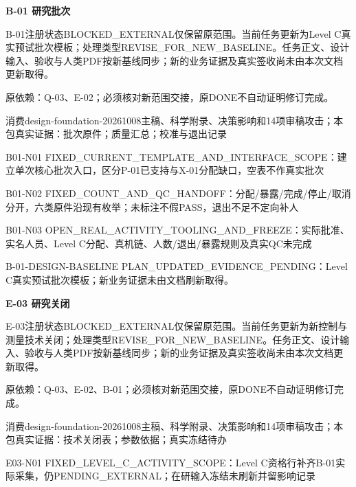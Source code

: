 \documentclass[11pt,a4paper]{article}
\newcommand{\reviewsection}[1]{\par\Needspace{5\baselineskip}\vspace{10pt}\begin{center}{\titlelatin\titlecjk\bfseries\fontsize{14}{20}\selectfont #1}\end{center}}
\begin{document}
\reviewsection{B-\allowbreak{}01 研究批次}
B-\allowbreak{}01注册状态BLOCKED\_\allowbreak{}EXTERNAL仅保留原范围。当前任务更新为Level C真实预试批次模板；处理类型REVISE\_\allowbreak{}FOR\_\allowbreak{}NEW\_\allowbreak{}BASELINE。任务正文、设计输入、验收与人类PDF按新基线同步；新的业务证据及真实签收尚未由本次文档更新取得。


原依赖：Q-\allowbreak{}03、E-\allowbreak{}02；必须核对新范围交接，原DONE不自动证明修订完成。


消费design-\allowbreak{}foundation-\allowbreak{}20261008主稿、科学附录、决策影响和14项审稿攻击；本包真实证据：批次原件；质量汇总；校准与退出记录


B01-\allowbreak{}N01 FIXED\_\allowbreak{}CURRENT\_\allowbreak{}TEMPLATE\_\allowbreak{}AND\_\allowbreak{}INTERFACE\_\allowbreak{}SCOPE：建立单次核心批次入口，区分P-\allowbreak{}01已支持与X-\allowbreak{}01分配缺口，空表不作真实批次


B01-\allowbreak{}N02 FIXED\_\allowbreak{}COUNT\_\allowbreak{}AND\_\allowbreak{}QC\_\allowbreak{}HANDOFF：分配/\allowbreak{}暴露/\allowbreak{}完成/\allowbreak{}停止/\allowbreak{}取消分开，六类原件沿现有枚举；未标注不假PASS，退出不足不定向补人


B01-\allowbreak{}N03 OPEN\_\allowbreak{}REAL\_\allowbreak{}ACTIVITY\_\allowbreak{}TOOLING\_\allowbreak{}AND\_\allowbreak{}FREEZE：实际批准、实名人员、Level C分配、真机链、人数/\allowbreak{}退出/\allowbreak{}暴露规则及真实QC未完成


B-\allowbreak{}01-\allowbreak{}DESIGN-\allowbreak{}BASELINE PLAN\_\allowbreak{}UPDATED\_\allowbreak{}EVIDENCE\_\allowbreak{}PENDING：Level C真实预试批次模板；新业务证据未由文档刷新取得。


\reviewsection{E-\allowbreak{}03 研究关闭}
E-\allowbreak{}03注册状态BLOCKED\_\allowbreak{}EXTERNAL仅保留原范围。当前任务更新为新控制与测量技术关闭；处理类型REVISE\_\allowbreak{}FOR\_\allowbreak{}NEW\_\allowbreak{}BASELINE。任务正文、设计输入、验收与人类PDF按新基线同步；新的业务证据及真实签收尚未由本次文档更新取得。


原依赖：Q-\allowbreak{}03、E-\allowbreak{}02、B-\allowbreak{}01；必须核对新范围交接，原DONE不自动证明修订完成。


消费design-\allowbreak{}foundation-\allowbreak{}20261008主稿、科学附录、决策影响和14项审稿攻击；本包真实证据：技术关闭表；参数依据；真实冻结待办


E03-\allowbreak{}N01 FIXED\_\allowbreak{}LEVEL\_\allowbreak{}C\_\allowbreak{}ACTIVITY\_\allowbreak{}SCOPE：Level C资格行补齐B-\allowbreak{}01实际采集，仍PENDING\_\allowbreak{}EXTERNAL；在研输入冻结未刷新并留影响记录
\end{document}
